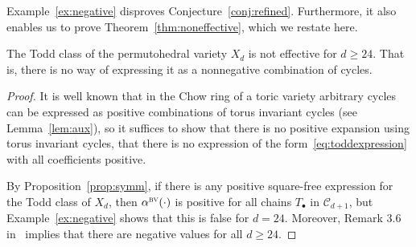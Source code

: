 \documentclass[ALCO,ThmDefs,Unicode,epreuves]{cedram}
\newcommand{\CC}{\mathcal{C}}
\newcommand{\bv}{\alpha^{\textsc{bv}}}
\begin{document}
Example~\ref{ex:negative} disproves Conjecture~\ref{conj:refined}. Furthermore, it also enables us to prove Theorem~\ref{thm:noneffective}, which we restate here.

\begin{thm}\label{thm:noneffective-restate}
	The Todd class of the permutohedral variety $X_d$ is not effective for $d\geq 24$. That is, there is no way of expressing it as a nonnegative combination of cycles.
\end{thm}
\begin{proof}
	It is well known that in the Chow ring of a toric variety arbitrary cycles can be expressed as positive combinations of torus invariant cycles (see Lemma~\ref{lem:aux}), so it suffices to show that there is no positive expansion using torus invariant cycles, \ie that there is no expression of the form~\eqref{eq:toddexpression} with all coefficients positive.
	
	By Proposition~\ref{prop:symm}, if there is any positive square-free expression for the Todd class of $X_d$, then $\bv(\cdot)$ is positive for all chains $T_\bullet$ in $\CC_{d+1}$, but Example~\ref{ex:negative} shows that this is false for $d=24$. Moreover, Remark 3.6 in~\cite{bvalpha} implies that there are negative values for all $d\geq 24$. 
\end{proof}
\end{document}
